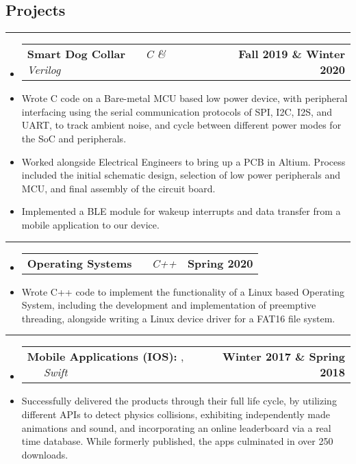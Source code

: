 \documentclass[10pt,letterpaper]{article}
\makeatletter
\newcommand{\header}[2]
{
	\begin{tabular*}{\linewidth}{l @{\extracolsep{\fill}} r}
		\hspace{-27pt} #1 & #2 \\
	\end{tabular*}
}
\newcommand{\sectionbreak}
{
	\vspace{-1.2em}
	\rule{\textwidth}{1.7pt}
	\vspace{-1.7em}
}
\makeatother
\begin{document}
\subsection*{Projects}
\sectionbreak


\begin{itemize}
	\item[]
		\header
		{
			\textbf{Smart Dog Collar}
			\emph{\smash{Relevant Course Project}} \ \ \ \footnotesize \emph{C \& Verilog}
		}
			{\textbf{Fall 2019 \& Winter 2020}}
		\item 
			Wrote C code on a Bare-metal MCU based low power device, with peripheral interfacing using the serial communication protocols of SPI, I2C, I2S, and UART, to track ambient noise, and cycle between different power modes for the SoC and peripherals.
		\item 
			Worked alongside Electrical Engineers to bring up a PCB in Altium. Process included the initial schematic design, selection of low power peripherals and MCU, and final assembly of the circuit board.

		\item 
			Implemented a BLE module for wakeup interrupts and data transfer from a mobile application to our device. 
\end{itemize}

\hrule

\begin{itemize}
	\item[]
		\header
		{
			\textbf{Operating Systems}
			\emph{\smash{Relevant Course Project}} \ \ \ \footnotesize \emph{C++}
		}
			{\textbf{Spring 2020}}
		\item 
			Wrote C++ code to implement the functionality of a Linux based Operating System, including the development and implementation of preemptive threading, alongside writing a Linux device driver for a FAT16 file system.

\end{itemize}
\hrule
\begin{itemize}
	\item[]
		\header
		{
			\textbf{Mobile Applications (IOS): }
			\href{https://appadvice.com/app/round-bound/1369632746}{\emph{\underline{\smash{Round 'a Bound}}}}, 
			\href{https://appadvice.com/app/tic-tac-emoji/1346934986}{\emph{\underline{\smash{Tic-Tac Emoji}}}} \ \ \ \footnotesize  \emph{Swift}
		}
			{\textbf{Winter 2017 \& Spring 2018}}
		\item 
			Successfully delivered the products through their full life cycle, by utilizing different APIs to detect physics collisions, exhibiting independently made animations and sound, and incorporating an online leaderboard via a real time database. While formerly published, the apps culminated in over 250 downloads.
\end{itemize}
\end{document}
